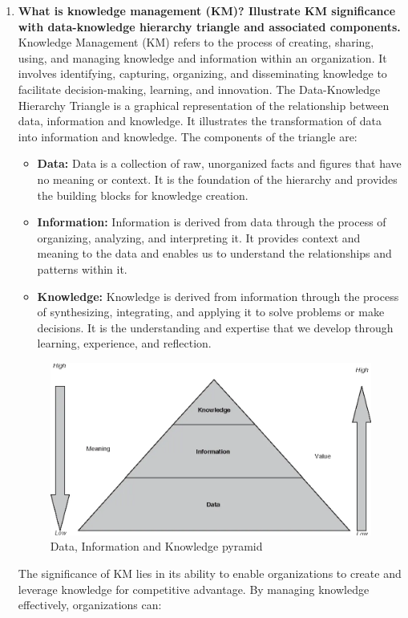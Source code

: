 \documentclass[12pt]{article}
\begin{document}
\begin{enumerate}
    \item{\bfseries What is knowledge management (KM)? Illustrate KM significance with data-knowledge hierarchy triangle and associated components.\\}
    Knowledge Management (KM) refers to the process of creating, sharing, using, and managing knowledge and information within an organization. It involves identifying, capturing, organizing, and disseminating knowledge to facilitate decision-making, learning, and innovation. The Data-Knowledge Hierarchy Triangle is a graphical representation of the relationship between data, information and knowledge. It illustrates the transformation of data into information and knowledge. The components of the triangle are:

\begin{itemize}
\item \textbf{Data:} Data is a collection of raw, unorganized facts and figures that have no meaning or context. It is the foundation of the hierarchy and provides the building blocks for knowledge creation.
\item \textbf{Information:} Information is derived from data through the process of organizing, analyzing, and interpreting it. It provides context and meaning to the data and enables us to understand the relationships and patterns within it.
\item \textbf{Knowledge:} Knowledge is derived from information through the process of synthesizing, integrating, and applying it to solve problems or make decisions. It is the understanding and expertise that we develop through learning, experience, and reflection.
\end{itemize}
\begin{figure}[h!]
    \centering
    \includegraphics[scale=0.35]{images/DIK.png}
    \caption{Data, Information and Knowledge pyramid}
\end{figure}
The significance of KM lies in its ability to enable organizations to create and leverage knowledge for competitive advantage. By managing knowledge effectively, organizations can:


\end{enumerate}
\end{document}
